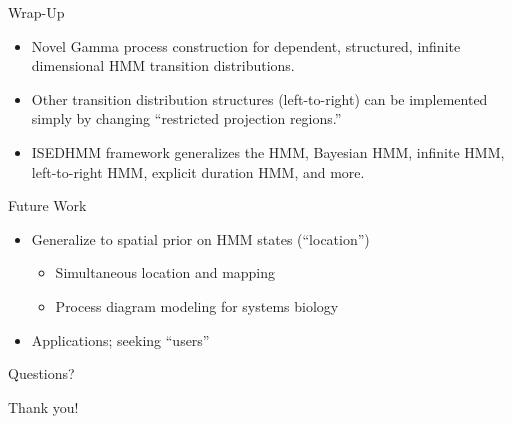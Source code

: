 \documentclass[xcolor=dvipsnames]{beamer}
\begin{document}
\begin{frame}[t]{Wrap-Up}
\begin{itemize}
\item Novel Gamma process construction for dependent, structured, infinite dimensional HMM transition distributions.
\item Other transition distribution structures (left-to-right) can be implemented simply by changing ``restricted projection regions.''
\item ISEDHMM framework generalizes the HMM, Bayesian HMM, infinite HMM, left-to-right HMM, explicit duration HMM, and more.
\end{itemize}

\end{frame}

\begin{frame}[t]{Future Work}
\begin{itemize}
\item Generalize to spatial prior on HMM states (``location'')
\begin{itemize}
\item Simultaneous location and mapping
\item Process diagram modeling for systems biology
\end{itemize}
\item Applications; seeking ``users''
\end{itemize}

\end{frame}

\begin{frame}[t]{Questions?}

Thank you!

\end{frame}



%
%
%
%
%
%
%
%
%
%
\end{document}
